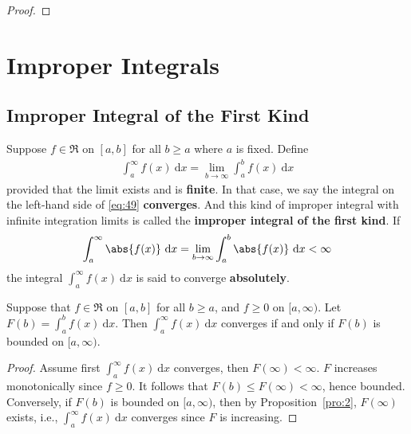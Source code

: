 \documentclass[thmcnt=section, 12pt]{elegantbook}
\begin{document}
\begin{proof}
\end{proof}



\chapter{Improper Integrals}


\section{Improper Integral of the First Kind}


\begin{definition}
    Suppose $f \in \mathfrak{R}$ on $[a,b]$ for all $b \geq a$ where $a$ is fixed. Define 
    \begin{align}
        \int_a^\infty f(x) \ \mathrm{d}x
        = \lim_{b \to \infty} \int_a^b f(x) \ \mathrm{d}x
        \label{eq:49}
    \end{align}
    provided that the limit exists and is \textbf{finite}. In that case, we say the integral on the left-hand side of \eqref{eq:49} \textbf{converges}. And this kind of improper integral with infinite integration limits is called the \textbf{improper integral of the first kind}. If 
    \begin{align*}
        \int_a^\infty \abs{f(x)} \ \mathrm{d}x
        = \lim_{b \to \infty} \int_a^b \abs{f(x)} \ \mathrm{d}x
        < \infty
    \end{align*}
    the integral $\int_a^\infty f(x) \ \mathrm{d}x$ is said to converge \textbf{absolutely}.
\end{definition}


\begin{theorem}
    Suppose that $f \in \mathfrak{R}$ on $[a,b]$ for all $b \geq a$, and $f \geq 0$ on $[a, \infty)$. Let $F(b) = \int_a^b f(x) \ \mathrm{d}x$. Then $\int_a^\infty f(x) \ \mathrm{d}x$ converges if and only if $F(b)$ is bounded on $[a, \infty)$.
\end{theorem}

\begin{proof}
    Assume first $\int_a^\infty f(x) \ \mathrm{d}x$ converges, then $F(\infty) < \infty$. $F$ increases monotonically since $f \geq 0$. It follows that $F(b) \leq F(\infty) < \infty$, hence bounded. Conversely, if $F(b)$ is bounded on $[a, \infty)$, then by Proposition~\ref{pro:2}, $F(\infty)$ exists, i.e., $\int_a^\infty f(x) \ \mathrm{d}x$ converges since $F$ is increasing.
\end{proof}
\end{document}
